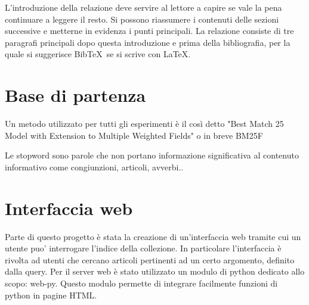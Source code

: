 \documentclass[runningheads]{llncs}
\begin{document}
L'introduzione della relazione deve servire al lettore a capire se
vale la pena continuare a leggere il resto.  Si possono riassumere i
contenuti delle sezioni successive e metterne in evidenza i punti
principali.  La relazione consiste di tre paragrafi principali dopo
questa introduzione e prima della bibliografia, per la quale si
suggerisce Bib\TeX\ se si scrive con \LaTeX.

\section{Base di partenza}
\label{sec:base-di-partenza}

Un metodo utilizzato per tutti gli esperimenti \`e il cos\`i detto
"Best Match 25 Model with Extension to Multiple Weighted Fields" o in breve BM25F


Le stopword\cite{WBC_stopword} sono parole che non portano informazione
significativa al contenuto informativo come congiunzioni, articoli, avverbi..\par

%
%


\section{Interfaccia web}

Parte di questo progetto \`e stata la creazione di un'interfaccia web
tramite cui un utente puo' interrogare l'indice della collezione.
In particolare l'interfaccia \`e rivolta ad utenti che cercano articoli
pertinenti ad un certo argomento, definito dalla query.
Per il server web \`e stato utilizzato un modulo di python dedicato allo scopo: web-py.
Questo modulo permette di integrare facilmente funzioni di python in pagine HTML.
\end{document}
